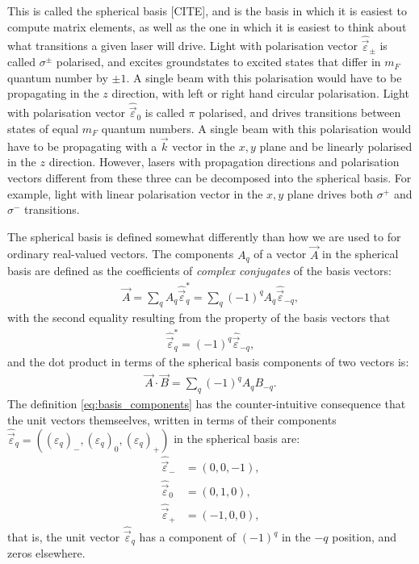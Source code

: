 This is called the spherical basis [CITE], and is the basis in which it is easiest to compute matrix elements, as well as the one in which it is easiest to think about what transitions a given laser will drive. Light with polarisation vector $\hat{\vec\varepsilon}_{\pm}$ is called $\sigma^\pm$ polarised, and excites groundstates to excited states that differ in $m_F$ quantum number by $\pm 1$. A single beam with this polarisation would have to be propagating in the $z$ direction, with left or right hand circular polarisation. Light with polarisation vector $\hat{\vec\varepsilon}_0$ is called $\pi$ polarised, and drives transitions between states of equal $m_F$ quantum numbers. A single beam with this polarisation would have to be propagating with a $\vec k$ vector in the $x,y$ plane and be linearly polarised in the $z$ direction. However, lasers with propagation directions and polarisation vectors different from these three can be decomposed into the spherical basis. For example, light with linear polarisation vector in the $x,y$ plane drives both $\sigma^+$ and $\sigma^-$ transitions.

The spherical basis is defined somewhat differently than how we are used to for ordinary real-valued vectors. The components $A_q$ of a vector $\vec A$ in the spherical basis are defined as the coefficients of \emph{complex conjugates} of the basis vectors:
\begin{align}\label{eq:basis_components}
\vec A = \sum_q A_q \hat{\vec\varepsilon}_q^* = \sum_q (-1)^q A_q \hat{\vec\varepsilon}_{-q},
\end{align}
with the second equality resulting from the property of the basis vectors that
\begin{align}\label{eq:spherical_negative_property}
\hat{\vec\varepsilon}_q^* = (-1)^q\hat{\vec\varepsilon}_{-q},
\end{align}
and the dot product in terms of the spherical basis components of two vectors is:
\begin{align}\label{eq:spherical_dot_product}
\vec A \cdot \vec B = \sum_q (-1)^q A_q B_{-q}.
\end{align}
The definition \eqref{eq:basis_components} has the counter-intuitive consequence that the unit vectors themseelves, written in terms of their components $\hat{\vec\varepsilon}_q = \left((\varepsilon_q)_{-}, (\varepsilon_q)_{0}, (\varepsilon_q)_{+}\right)$ in the spherical basis are:
\begin{align}
\hat{\vec\varepsilon}_{-} &= (0, 0, -1),\\
\hat{\vec\varepsilon}_0 &= (0, 1, 0),\\
\hat{\vec\varepsilon}_{+} &= (-1, 0, 0),
\end{align}
that is, the unit vector $\hat{\vec\varepsilon}_{q}$ has a component of $(-1)^q$ in the $-q$ position, and zeros elsewhere.

